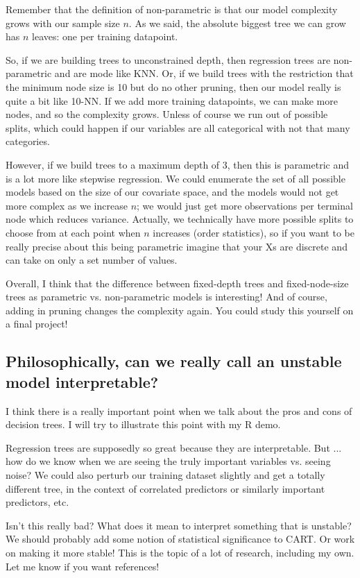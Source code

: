 Remember that the definition of non-parametric is that our model complexity grows with our sample size $n$. As we said, the absolute biggest tree we can grow has $n$ leaves: one per training datapoint.

So, if we are building trees to unconstrained depth, then regression trees are non-parametric and are mode like KNN. Or, if we build trees with the restriction that the minimum node size is 10 but do no other pruning, then our model really is quite a bit like 10-NN. If we add more training datapoints, we can make more nodes, and so the complexity grows. Unless of course we run out of possible splits, which could happen if our variables are all categorical with not that many categories. 

However, if we build trees to a maximum depth of 3, then this is parametric and is a lot more like stepwise regression. We could enumerate the set of all possible models based on the size of our covariate space, and the models would not get more complex as we increase $n$; we would just get more observations per terminal node which reduces variance. Actually, we technically have more possible splits to choose from at each point when $n$ increases (order statistics), so if you want to be really precise about this being parametric imagine that your Xs are discrete and can take on only a set number of values. 

Overall, I think that the difference between fixed-depth trees and fixed-node-size trees as parametric vs. non-parametric models is interesting! And of course, adding in pruning changes the complexity again. You could study this yourself on a final project!

\subsection{Philosophically, can we really call an unstable model interpretable?}

I think there is a really important point when we talk about the pros and cons of decision trees. I will try to illustrate this point with my R demo.

Regression trees are supposedly so great because they are interpretable. But ... how do we know when we are seeing the truly important variables vs. seeing noise? We could also perturb our training dataset slightly and get a totally different tree, in the context of correlated predictors or similarly important predictors, etc. 

Isn't this really bad? What does it mean to interpret something that is unstable? We should probably add some notion of statistical significance to CART. Or work on making it more stable! This is the topic of a lot of research, including my own.  Let me know if you want references!





